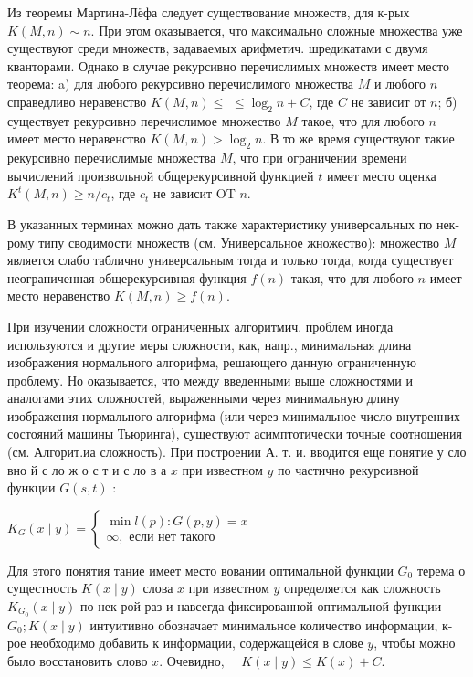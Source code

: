 \documentclass[10pt]{article}
\begin{document}
Из теоремы Мартина-Лёфа следует существование множеств, для к-рых $K(M, n) \sim n$. При этом оказывается, что максимально сложные множества уже существуют среди множеств, задаваемых арифметич. шредикатами с двумя кванторами. Однако в случае рекурсивно перечислимых множеств имеет место теорема: a) для любого рекурсивно перечислимого множества $M$ и любого $n$ справедливо неравенство $K(M, n) \leqslant$ $\leqslant \log _{2} n+C$, где $C$ не зависит от $n$; б) существует рекурсивно перечислимое множество $M$ такое, что для любого $n$ имеет место неравенство $K(M, n)>\log _{2} n$. В то же время существуют такие рекурсивно перечислимые множества $M$, что при ограничении времени вычислений произвольной общерекурсивной функцией $t$ имеет место оценка $K^{t}(M, n) \geqslant n / c_{t}$, где $c_{t}$ не зависит OT $n$.



В указанных терминах можно дать также характеристику универсальных по нек-рому типу сводимости множеств (см. Универсальное жножество): множество $M$ является слабо таблично универсальным тогда и только тогда, когда существует неограниченная общерекурсивная функция $f(n)$ такая, что для любого $n$ имеет место неравенство $K(M, n) \geqslant f(n)$.



При изучении сложности ограниченных алгоритмич. проблем иногда используются и другие меры сложности, как, напр., минимальная длина изображения нормального алгорифма, решающего данную ограниченную проблему. Но оказывается, что между введенными выше сложностями и аналогами этих сложностей, выраженными через минимальную длину изображения нормального алгорифма (или через минимальное число внутренних состояний машины Тьюринга), существуют асимптотически точные соотношения (см. Алгорит.иа сложность). При построении А. т. и. вводится еще понятие у сло вно й с ло ж о с т и с ло в а $x$ при известном $y$ по частично рекурсивной функции $G(s, t)$ :



$K_{G}(x \mid y)=\left\{\begin{array}{l}\min l(p): G(p, y)=x \\ \infty, \text { если нет такого }\end{array}\right.$



Для этого понятия тание имеет место вовании оптимальной функции $G_{0}$ терема о сущестность $K(x \mid y)$ слова $x$ при известном $y$ определяется как сложность $K_{G_{0}}(x \mid y)$ по нек-рой раз и навсегда фиксированной оптимальной функции $G_{0} ; K(x \mid y)$ интуитивно обозначает минимальное количество информации, к-рое необходимо добавить к информации, содержащейся в слове $y$, чтобы можно было восстановить слово $x$. Очевидно, $\quad K(x \mid y) \leqslant K(x)+C$.
\end{document}
